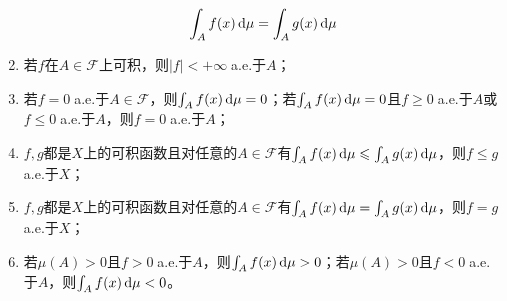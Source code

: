\begin{property}
\begin{enumerate}
\begin{equation*}
			\int_{A}f(x)\mathop{}\!\mathrm{d}\mu=\int_{A}g(x)\mathop{}\!\mathrm{d}\mu
		\end{equation*}
		\item 若$f$在$A\in\mathscr{F}$上可积，则$|f|<+\infty\;$a.e.于$A$；
		\item 若$f=0\;$a.e.于$A\in \mathscr{F}$，则$\int_{A}f(x)\mathop{}\!\mathrm{d}\mu=0$；若$\int_{A}f(x)\mathop{}\!\mathrm{d}\mu=0$且$f\geqslant0\;$a.e.于$A$或$f\leqslant0\;$a.e.于$A$，则$f=0\;$a.e.于$A$；
		\item $f,g$都是$X$上的可积函数且对任意的$A\in \mathscr{F}$有$\int_{A}f(x)\mathop{}\!\mathrm{d}\mu\leqslant\int_{A}g(x)\mathop{}\!\mathrm{d}\mu$，则$f\leqslant g\;$a.e.于$X$；
		\item $f,g$都是$X$上的可积函数且对任意的$A\in \mathscr{F}$有$\int_{A}f(x)\mathop{}\!\mathrm{d}\mu=\int_{A}g(x)\mathop{}\!\mathrm{d}\mu$，则$f=g\;$a.e.于$X$；
		\item 若$\mu(A)>0$且$f>0\;$a.e.于$A$，则$\int_{A}f(x)\mathop{}\!\mathrm{d}\mu>0$；若$\mu(A)>0$且$f<0\;$a.e.于$A$，则$\int_{A}f(x)\mathop{}\!\mathrm{d}\mu<0$。
	\end{enumerate}
\end{property}
